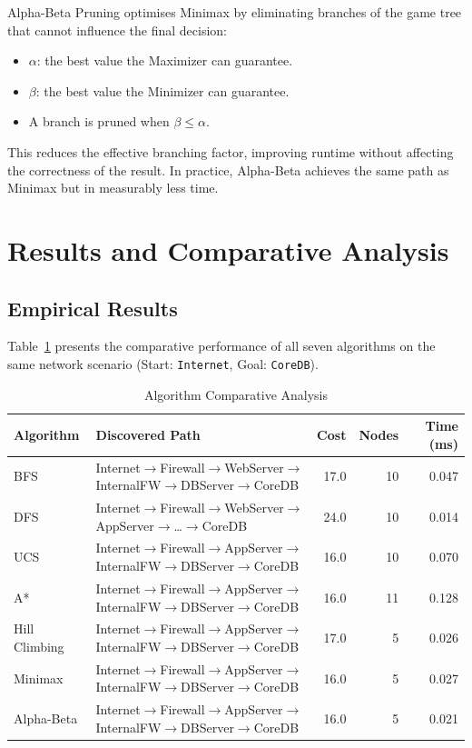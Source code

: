 \documentclass[12pt,a4paper]{article}
\begin{document}
Alpha-Beta Pruning optimises Minimax by eliminating branches of the game tree that
cannot influence the final decision:
\begin{itemize}
    \item $\alpha$: the best value the Maximizer can guarantee.
    \item $\beta$: the best value the Minimizer can guarantee.
    \item A branch is pruned when $\beta \leq \alpha$.
\end{itemize}

This reduces the effective branching factor, improving runtime without affecting the
correctness of the result. In practice, Alpha-Beta achieves the same path as Minimax
but in measurably less time.

\section{Results and Comparative Analysis}

\subsection{Empirical Results}

Table~\ref{tab:results} presents the comparative performance of all seven algorithms
on the same network scenario (Start: \texttt{Internet}, Goal: \texttt{CoreDB}).

\begin{table}[H]
    \centering
    \caption{Algorithm Comparative Analysis}
    \label{tab:results}
    \renewcommand{\arraystretch}{1.4}
    \begin{tabular}{p{2.5cm} p{6cm} r r r}
        \toprule
        \textbf{Algorithm} & \textbf{Discovered Path} & \textbf{Cost} & \textbf{Nodes} & \textbf{Time (ms)} \\
        \midrule
        BFS           & Internet$\to$Firewall$\to$WebServer$\to$InternalFW$\to$DBServer$\to$CoreDB & 17.0 & 10 & 0.047 \\
        DFS           & Internet$\to$Firewall$\to$WebServer$\to$AppServer$\to$\ldots$\to$CoreDB    & 24.0 & 10 & 0.014 \\
        UCS           & Internet$\to$Firewall$\to$AppServer$\to$InternalFW$\to$DBServer$\to$CoreDB & 16.0 & 10 & 0.070 \\
        A*            & Internet$\to$Firewall$\to$AppServer$\to$InternalFW$\to$DBServer$\to$CoreDB & 16.0 & 11 & 0.128 \\
        Hill Climbing & Internet$\to$Firewall$\to$AppServer$\to$InternalFW$\to$DBServer$\to$CoreDB & 17.0 &  5 & 0.026 \\
        Minimax       & Internet$\to$Firewall$\to$AppServer$\to$InternalFW$\to$DBServer$\to$CoreDB & 16.0 &  5 & 0.027 \\
        Alpha-Beta    & Internet$\to$Firewall$\to$AppServer$\to$InternalFW$\to$DBServer$\to$CoreDB & 16.0 &  5 & 0.021 \\
        \bottomrule
    \end{tabular}
\end{table}
\end{document}
